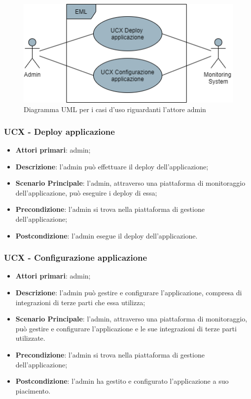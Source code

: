 \begin{figure}[H]
\centering
\includegraphics[scale=0.6]{res/UseCase/Immagini/Admin}
\caption{Diagramma UML per i casi d'uso riguardanti l'attore admin}
\end{figure}

\subsubsection{UCX - Deploy applicazione}
\begin{itemize}
\item \textbf{Attori primari}: admin;
\item \textbf{Descrizione}: l'admin può effettuare il deploy dell'applicazione;
\item \textbf{Scenario Principale}: l'admin, attraverso una piattaforma di monitoraggio dell'applicazione, può eseguire i deploy di essa;
\item \textbf{Precondizione}: l'admin si trova nella piattaforma di gestione dell'applicazione;
\item \textbf{Postcondizione}: l'admin esegue il deploy dell'applicazione.
\end{itemize}

\subsubsection{UCX - Configurazione applicazione}
\begin{itemize}
\item \textbf{Attori primari}: admin;
\item \textbf{Descrizione}: l'admin può gestire e configurare l'applicazione, compresa di integrazioni di terze parti che essa utilizza;
\item \textbf{Scenario Principale}: l'admin, attraverso una piattaforma di monitoraggio, può gestire e configurare l'applicazione e le sue integrazioni di terze parti utilizzate.
\item \textbf{Precondizione}: l'admin si trova nella piattaforma di gestione dell'applicazione;
\item \textbf{Postcondizione}: l'admin ha gestito e configurato l'applicazione a suo piacimento.
\end{itemize}

